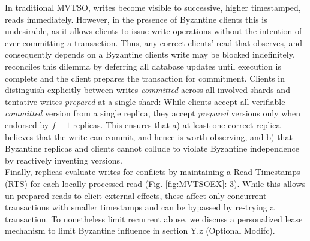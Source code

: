 In traditional MVTSO, writes become visible to successive, higher timestamped, reads immediately. However, in the presence of Byzantine clients this is undesirable, as it allows clients to issue write operations without the intention of ever committing a transaction. Thus, any correct clients' read that observes, and consequently depends on a Byzantine clients write may be blocked indefinitely.
\sys reconciles this dilemma by deferring all database updates until execution is complete and the client prepares the transaction for commitment. 
 
Clients in \sys distinguish explicitly between writes \textit{committed} across all involved shards and tentative writes \textit{prepared} at a single shard: While clients accept all verifiable \textit{committed} version from a single replica, they accept \textit{prepared} versions only when endorsed by $f+1$ replicas. This ensures that a) at least one correct replica believes that the write can commit, and hence is worth observing, and b) that Byzantine replicas and clients cannot collude to violate Byzantine independence by reactively inventing versions. \\
Finally, \sys replicas evaluate writes for conflicts by maintaining a Read Timestamps (RTS) for each locally processed read (Fig. \ref{fig:MVTSOEX}: 3). While this allows un-prepared reads to elicit external effects, these affect only concurrent transactions with smaller timestamps and can be bypassed by re-trying a transaction. To nonetheless limit recurrent abuse, we discuss a personalized lease mechanism to limit Byzantine influence in section Y.z (Optional Modifc). 



